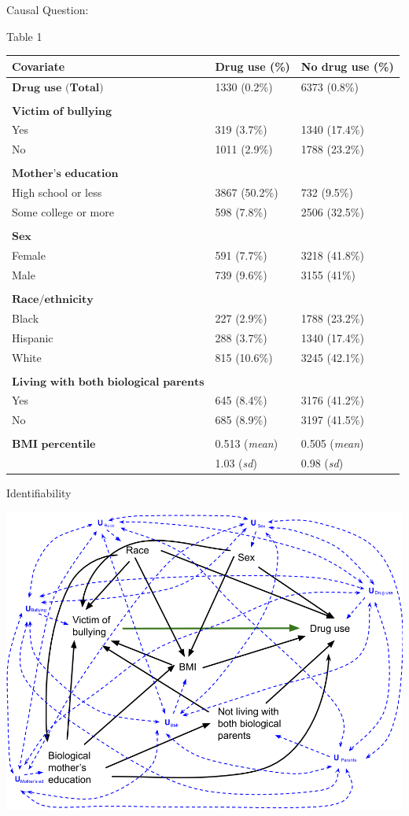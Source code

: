 \documentclass[ignorenonframetext,]{beamer}
\begin{document}
\begin{frame}{Causal Question:}
\begin{block}{Table 1}
\begin{longtable}[]{@{}lll@{}}
\toprule
Covariate & Drug use (\%) & No drug use (\%)\tabularnewline
\midrule
\endhead
\(\textbf{Drug use (Total)}\) & 1330 (0.2\%) & 6373
(0.8\%)\tabularnewline
& &\tabularnewline
\(\textbf{Victim of bullying}\) & &\tabularnewline
Yes & 319 (3.7\%) & 1340 (17.4\%)\tabularnewline
No & 1011 (2.9\%) & 1788 (23.2\%)\tabularnewline
& &\tabularnewline
\(\textbf{Mother's education}\) & &\tabularnewline
High school or less & 3867 (50.2\%) & 732 (9.5\%)\tabularnewline
Some college or more & 598 (7.8\%) & 2506 (32.5\%)\tabularnewline
& &\tabularnewline
\(\textbf{Sex}\) & &\tabularnewline
Female & 591 (7.7\%) & 3218 (41.8\%)\tabularnewline
Male & 739 (9.6\%) & 3155 (41\%)\tabularnewline
& &\tabularnewline
\(\textbf{Race/ethnicity}\) & &\tabularnewline
Black & 227 (2.9\%) & 1788 (23.2\%)\tabularnewline
Hispanic & 288 (3.7\%) & 1340 (17.4\%)\tabularnewline
White & 815 (10.6\%) & 3245 (42.1\%)\tabularnewline
& &\tabularnewline
\(\textbf{Living with both biological parents}\) & &\tabularnewline
Yes & 645 (8.4\%) & 3176 (41.2\%)\tabularnewline
No & 685 (8.9\%) & 3197 (41.5\%)\tabularnewline
& &\tabularnewline
\(\textbf{BMI percentile}\) & 0.513 (\emph{mean}) & 0.505
(\emph{mean})\tabularnewline
\textcolor{white}{x} & 1.03 (\emph{sd}) & 0.98
(\emph{sd})\tabularnewline
\bottomrule
\end{longtable}

\end{block}

\begin{block}{Identifiability}

\includegraphics[width=1\linewidth]{DAG Causal Final Project_reduced covariates with Us}


\end{block}
\end{frame}
\end{document}

